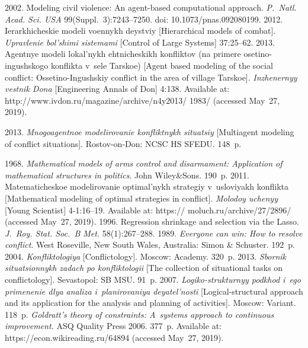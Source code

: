 \begin{multicols}{2}
{{\begin{thebibliography}{99}
 2002. Modeling civil 
violence: An agent-based computational approach. \textit{P.~Natl. Acad. Sci. USA} 
99(Suppl.~3):7243--7250. 
doi: 10.1073/pnas.092080199.
 2012. Ierarkhicheskie modeli voennykh deystviy [Hierarchical 
models of combat]. \textit{Upravlenie bol'shimi sistemami} [Control of Large 
Systems] 37:25--62.
 2013. Agentnye modeli lokal'nykh 
ehtnicheskikh konfliktov (na primere ose\-ti\-no-in\-gush\-sko\-go konflikta v~sele Tarskoe) 
[Agent based modeling of the social conflict: Ossetino-Ingushskiy conflict 
in the area of village Tarskoe]. \textit{Inzhenernyy vestnik Dona} [Engineering Annals of Don] 
4:138. Available at: {\sf http://www.ivdon.ru/magazine/archive/n4y2013/ 1983/}
 (accessed 
May~27, 2019).

 2013. \textit{Mnogoagentnoe 
modelirovanie konfliktnykh situatsiy} [Multiagent modeling of conflict situations]. 
Rostov-on-Don: NCSC HS SFEDU. 148~p.


 1968. \textit{Mathematical models of arms control and disarmament: 
Application of mathematical structures in politics}. John Wiley\&Sons. 190~p.
 2011. 
Matematicheskoe modelirovanie op\-ti\-mal'\-nykh strategiy v~usloviyakh konflikta 
[Mathematical modeling of optimal strategies in conflict]. \textit{Molodoy uchenyy} 
[Young Scientist] 4-1:16--19. Available at: {\sf  
 https:// moluch.ru/archive/27/2896/} (accessed May~27, 2019).
 1996. Regression shrinkage and selection via the Lasso. 
\textit{J.~Roy. Stat. Soc.~B Met.} 58(1):267--288.
 1989. \textit{Everyone can win:
How to resolve conflict}. West Roseville, New South Wales, Australia: 
Simon \& Schuster. 192~p.
 2004. \textit{Konfliktologiya} 
[Conflictology]. Moscow: Academy. 320~p.
 2013. \textit{Sbornik 
situatsionnykh zadach po konfliktologii} [The collection of situational tasks on 
conflictology]. Se\-va\-sto\-pol:  SB MSU. 91~p.
 2007. \textit{Logiko-strukturnyy podkhod 
i~ego primenenie dlya analiza i~planirovaniya deya\-tel'\-nosti} [Logical-structural 
approach and its application for the analysis and planning of activities]. Moscow: 
Variant. 118~p. 
 \textit{Goldratt's theory of constraints: A~systems approach to 
continuous improvement.} ASQ Quality Press 2006. 377~p. Available at: {\sf 
https://econ.wikireading.ru/64894} (accessed May~27, 2019).
 \end{thebibliography}

 }
 }

\end{multicols}


